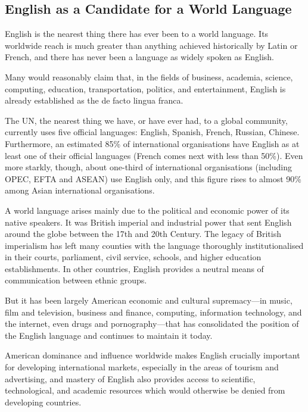 \documentclass[../main.tex]{subfiles}
\begin{document}
    \subsection{English as a Candidate for a World Language}
        English is the nearest thing there has ever been to a world language. Its worldwide reach is much greater than anything achieved historically by Latin or French, and there has never been a language as widely spoken as English. \par 
        Many would reasonably claim that, in the fields of business, academia, science, computing, education, transportation, politics, and entertainment, English is already established as the de facto lingua franca. \par 
        The UN, the nearest thing we have, or have ever had, to a global community, currently uses five official languages: English, Spanish, French, Russian, Chinese. Furthermore, an estimated 85\% of international organisations have English as at least one of their official languages (French comes next with less than 50\%). Even more starkly, though, about one-third of international organisations (including OPEC, EFTA and ASEAN) use English only, and this figure rises to almost 90\% among Asian international organisations.  \par 
        A world language arises mainly due to the political and economic power of its native speakers. It was British imperial and industrial power that sent English around the globe between the 17th and 20th Century. The legacy of British imperialism has left many counties with the language thoroughly institutionalised in their courts, parliament, civil service, schools, and higher education establishments. In other countries, English provides a neutral means of communication between ethnic groups. \par
        But it has been largely American economic and cultural supremacy---in music, film and television, business and finance, computing, information technology, and the internet, even drugs and pornography---that has consolidated the position of the English language and continues to maintain it today. \par 
        American dominance and influence worldwide makes English crucially important for developing international markets, especially in the areas of tourism and advertising, and mastery of English also provides access to scientific, technological, and academic resources which would otherwise be denied from developing countries. 
        
\end{document}
